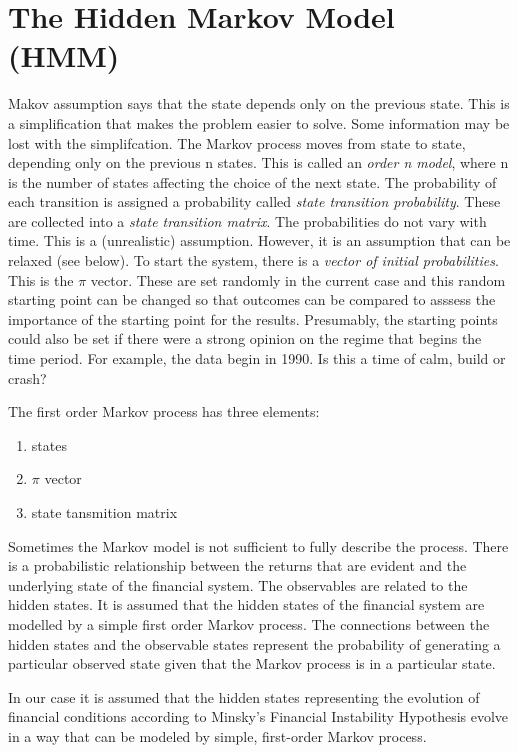 \documentclass[12pt, a4paper, oneside]{article} %
\begin{document}
\section{The Hidden Markov Model (HMM)}
Makov assumption says that the state depends only on the previous state. This is a simplification that makes the problem easier to solve.  Some information may be lost with the simplifcation. The Markov process moves from state to state, depending only on the previous n states.  This is called an \emph{order n model}, where n is the number of states affecting the choice of the next state. The probability of each transition is assigned  a probability called \emph{state transition probability}.  These are collected into a \emph{state transition matrix}. The probabilities do not vary with time.  This is a (unrealistic) assumption. However, it is an assumption that can be relaxed (see below).  To start the system, there is a \emph{vector of initial probabilities}.  This is the $\pi$ vector.  These are set randomly in the current case and this random starting point can be changed so that outcomes can be compared to asssess the importance of the starting point for the results. Presumably, the starting points could also be set if there were a strong opinion on the regime that begins the time period. For example, the data begin in 1990.  Is this a time  of calm, build or crash? 

The first order Markov process has three elements: 
\begin{enumerate}
\item states
\item $\pi$ vector
\item state tansmition matrix
\end{enumerate}
 Sometimes the Markov model is not sufficient to fully describe the process.    There is a probabilistic relationship between the returns that are evident and the underlying state of the financial system.  The observables are related to the hidden states. It is assumed that the hidden states of the financial system are modelled by a simple first order Markov process.  The connections between the hidden states and the observable states represent the probability of generating a particular observed state given that the Markov process is in a particular state.  
 
In our case it is assumed that the hidden states representing the evolution of financial conditions according to Minsky's Financial Instability Hypothesis evolve in a way that can be modeled by simple, first-order Markov process. 
 
\end{document}
